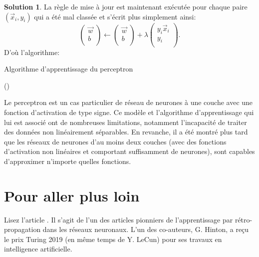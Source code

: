\documentclass[a4paper,francais]{article}
\theoremstyle{definition}
\newtheorem*{solution}{Solution}
\begin{document}
\begin{solution}
  La règle de mise à jour est maintenant exécutée pour chaque paire $(\vec{x}_i, y_i)$
  qui a été mal classée et s'écrit plus simplement ainsi: 
  \[
  \left(\begin{array}{c}
    \vec{w} \\
    b \\
  \end{array}
  \right)
  \leftarrow
  \left(\begin{array}{c}
    \vec{w} \\
    b \\
  \end{array}
  \right)
  +
  \lambda
  \left(\begin{array}{c}
    y_i\vec{x}_i \\
    y_i \\
  \end{array}
  \right).
  \]
  D'où l'algorithme:
  \begin{algorithm}[htbp]
    \caption{Algorithme d'apprentissage du perceptron}
    ()
     \;
  \end{algorithm}
\end{solution}

Le perceptron est un cas particulier de réseau de neurones à une couche
avec une fonction d'activation de type signe. Ce modèle et l'algorithme
d'apprentissage qui lui est associé ont de nombreuses limitations,
notamment l'incapacité de traiter des données non linéairement
séparables. En revanche, il a été montré plus tard que les réseaux de
neurones d'au moins deux couches (avec des fonctions d'activation non
linéaires et comportant suffisamment de neurones), sont capables d'approximer
n'importe quelles fonctions. 

\section{Pour aller plus loin}

Lisez l'article \cite{hinton86}. Il s'agit de l'un des articles pionniers
de l'apprentissage par rétro-propagation dans les réseaux neuronaux. L'un des
co-auteurs, G. Hinton, a reçu le prix Turing 2019 (en même temps de Y. LeCun)
pour ses travaux en intelligence artificielle.  
\end{document}
